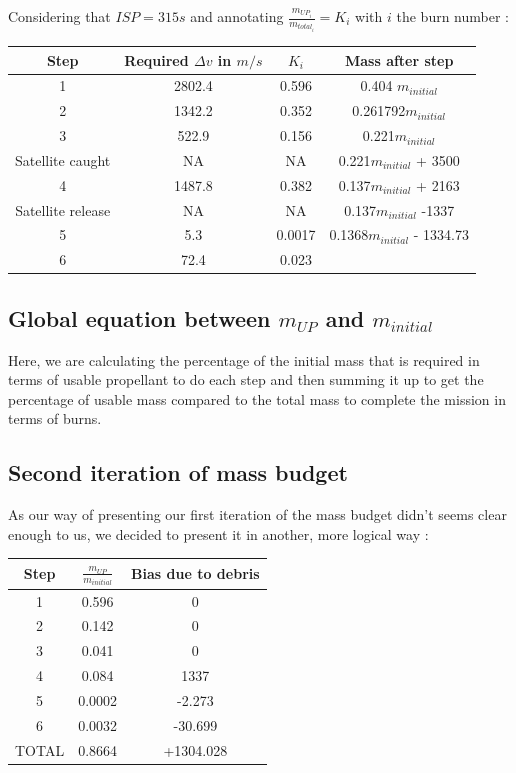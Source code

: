Considering that \(ISP = 315s\) and annotating
\(\frac{m_{UP_i}}{m_{total_i}} = K_i\) with \(i\) the burn number :

\begin{longtable}[]{@{}cccc@{}}
	\toprule
	Step & Required \(\Delta v\) in \(m/s\) & \(K_i\) & Mass after
	step\tabularnewline
	\midrule
	\endhead
	1 & 2802.4 & 0.596 & 0.404 \(m_{initial}\)\tabularnewline
	2 & 1342.2 & 0.352 & 0.261792\(m_{initial}\)\tabularnewline
	3 & 522.9 & 0.156 & 0.221\(m_{initial}\)\tabularnewline
	Satellite caught & NA & NA & 0.221\(m_{initial}\) + 3500\tabularnewline
	4 & 1487.8 & 0.382 & 0.137\(m_{initial}\) + 2163\tabularnewline
	Satellite release & NA & NA & 0.137\(m_{initial}\) -1337\tabularnewline
	5 & 5.3 & 0.0017 & 0.1368\(m_{initial}\) - 1334.73\tabularnewline
	6 & 72.4 & 0.023 &\tabularnewline
	\bottomrule
\end{longtable}

\hypertarget{header-n470}{%
	\subsection{\texorpdfstring{Global equation between \(m_{UP}\) and
			\(m_{initial}\)}{Global equation between m\_\{UP\} and m\_\{initial\}}}\label{header-n470}}

Here, we are calculating the percentage of the initial mass that is
required in terms of usable propellant to do each step and then summing
it up to get the percentage of usable mass compared to the total mass to
complete the mission in terms of burns.\\


\subsection{Second iteration of mass budget}

\qquad As our way of presenting our first iteration of the mass budget didn't seems clear enough to us, we decided to present it in another, more logical way :
\begin{longtable}[]{@{}ccc@{}}
	\toprule
	Step & \(\frac{m_{UP}}{m_{initial}}\) & Bias due to
	debris\tabularnewline
	\midrule
	\endhead
	1 & 0.596 & 0\tabularnewline
	2 & 0.142 & 0\tabularnewline
	3 & 0.041 & 0\tabularnewline
	4 & 0.084 & 1337\tabularnewline
	5 & 0.0002 & -2.273\tabularnewline
	6 & 0.0032 & -30.699\tabularnewline
	TOTAL & 0.8664 & +1304.028\tabularnewline
	\bottomrule
\end{longtable}

